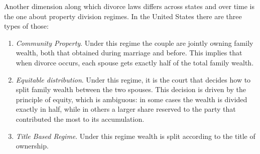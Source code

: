 \documentclass[12pt]{article}
\numberwithin{table}{section}
\begin{document}
Another dimension along which divorce laws differs across states and over time is the one about property division regimes. In the United States there are three types of those:
\begin{enumerate}
\item \textit{Community Property}. Under this regime the couple are jointly owning family wealth, both that obtained during marriage and before. This implies that when divorce occurs, each spouse gets exactly half of the total family wealth.
\item \textit{Equitable distribution}. Under this regime, it is the court that decides how to split family wealth between the two spouses. This decision is driven by the principle of equity, which is ambiguous: in some cases the wealth is divided exactly in half, while in others a larger share reserved to the party that contributed the most to its accumulation.
\item \textit{Title Based Regime}. Under this regime wealth is split according to the title of ownership.	
\end{enumerate}
\end{document}
